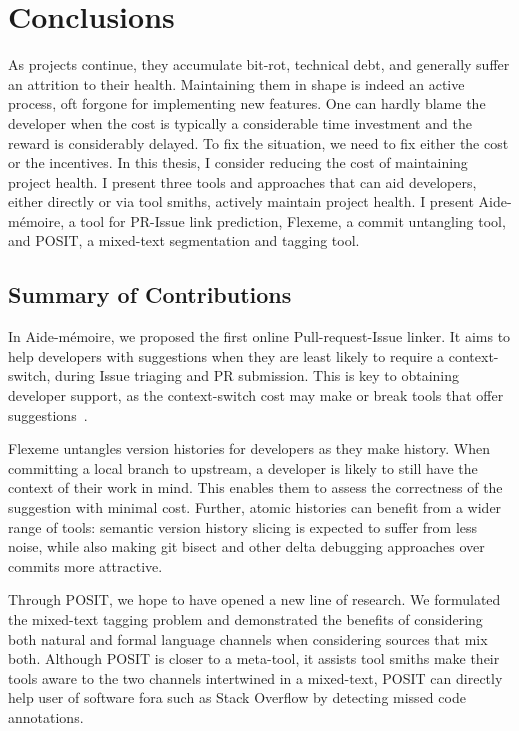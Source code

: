 \chapter{Conclusions}
\label{chapter:conclusions}

As projects continue, they accumulate bit-rot, technical debt, and generally
suffer an attrition to their health. Maintaining them in shape is indeed an
active process, oft forgone for implementing new features. One can hardly blame
the developer when the cost is typically a considerable time investment and the
reward is considerably delayed. To fix the situation, we need to fix either the
cost or the incentives. In this thesis, I consider reducing the cost of maintaining project health. I
present three tools and approaches that can aid developers, either directly or
via tool smiths, actively maintain project health. I present Aide-mémoire, a
tool for PR-Issue link prediction, Flexeme, a commit untangling tool, and POSIT,
a mixed-text segmentation and tagging tool. 

\section{Summary of Contributions}

In Aide-mémoire, we proposed the first online Pull-request-Issue linker. It aims
to help developers with suggestions when they are least likely to require a
context-switch, during Issue triaging and PR submission. This is key to
obtaining developer support, as the context-switch cost may make or break tools
that offer suggestions~\cite{ohearnKeynote2020}.

Flexeme untangles version histories for developers as they make history. When
committing a local branch to upstream, a developer is likely to still have the
context of their work in mind. This enables them to assess the correctness of
the suggestion with minimal cost. Further, atomic histories can benefit from a
wider range of tools: semantic version history slicing is expected to suffer
from less noise, while also making git bisect and other delta debugging
approaches over commits more attractive.

Through POSIT, we hope to have opened a new line of research. We formulated the
mixed-text tagging problem and demonstrated the benefits of considering both
natural and formal language channels when considering sources that mix both.
Although POSIT is closer to a meta-tool, it assists tool smiths make their tools
aware to the two channels intertwined in a mixed-text, POSIT can directly help
user of software fora such as Stack Overflow by detecting missed code
annotations.


